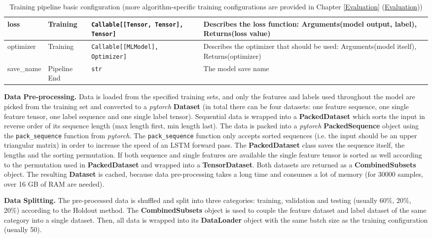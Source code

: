 \begin{table}[h!]
\begin{tabular}{|M{3.2cm}|M{2.3cm}|M{3.3cm}|M{4.4cm}|}
         \hline
         loss & Training & \texttt{Callable[[Tensor, Tensor], Tensor]} & Describes the loss function: Arguments(model output, label), Returns(loss value) \\
         \hline
         optimizer & Training & \texttt{Callable[[MLModel], Optimizer]} & Describes the optimizer that should be used: Arguments(model itself), Returns(optimizer) \\
         \hline
         save\_name & Pipeline End & \texttt{str} & The model save name \\
         \hline
    \end{tabular}
    \caption{Training pipeline basic configuration (more algorithm-specific training configurations are provided in Chapter \ref {Evaluation} (\hyperref[Evaluation]{Evaluation}))}
    \label{tab: pipeline_config}
\end{table}

\textbf{Data Pre-processing.} Data is loaded from the specified training sets, and only the features and labels used throughout the model are picked from the training set and converted to a \textit{pytorch} \textbf{Dataset} (in total there can be four datasets: one feature sequence, one single feature tensor, one label sequence and one single label tensor). Sequential data is wrapped into a \textbf{PackedDataset} which sorts the input in reverse order of its sequence length (max length first, min length last). The data is packed into a \textit{pytorch} \textbf{PackedSequence} object using the \texttt{pack\_sequence} function from \textit{pytorch}. The \texttt{pack\_sequence} function only accepts sorted sequences (i.e. the input should be an upper triangular matrix) in order to increase the speed of an LSTM forward pass. The \textbf{PackedDataset} class saves the sequence itself, the lengths and the sorting permutation. If both sequence and single features are available the single feature tensor is sorted as well according to the permutation used in \textbf{PackedDataset} and wrapped into a \textbf{TensorDataset}. Both datasets are returned as a \textbf{CombinedSubsets} object. The resulting \textbf{Dataset} is cached, because data pre-processing takes a long time and consumes a lot of memory (for 30000 samples, over 16 GB of RAM are needed).

\textbf{Data Splitting.} The pre-processed data is shuffled and split into three categories: training, validation and testing (usually 60\%, 20\%, 20\%) according to the Holdout method. The \textbf{CombinedSubsets} object is used to couple the feature dataset and label dataset of the same category into a single dataset. Then, all data is wrapped into its \textbf{DataLoader} object with the same batch size as the training configuration (usually 50).

